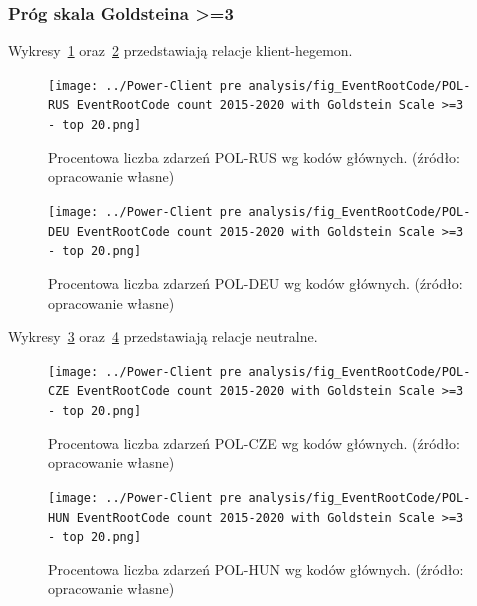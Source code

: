 \documentclass[11pt]{report}
\begin{document}
    \subsubsection{Próg skala Goldsteina >=3}\label{subsubsec:erc:próg-skala-goldsteina->=3}

    Wykresy~\ref{fig:Power-Client:ERC:Goldstein:POL-RUS} oraz~\ref{fig:Power-Client:ERC:Goldstein:POL-DEU} przedstawiają relacje klient-hegemon.

    \begin{figure}[tp]
        \centering
        \texttt{[image: ../Power-Client pre analysis/fig\_EventRootCode/POL-RUS EventRootCode count 2015-2020 with Goldstein Scale >=3 - top 20.png]}
        \caption{Procentowa liczba zdarzeń POL-RUS wg kodów głównych. (źródło: opracowanie własne)}
        \label{fig:Power-Client:ERC:Goldstein:POL-RUS}
    \end{figure}

    \begin{figure}[tp]
        \centering
        \texttt{[image: ../Power-Client pre analysis/fig\_EventRootCode/POL-DEU EventRootCode count 2015-2020 with Goldstein Scale >=3 - top 20.png]}
        \caption{Procentowa liczba zdarzeń POL-DEU wg kodów głównych. (źródło: opracowanie własne)}
        \label{fig:Power-Client:ERC:Goldstein:POL-DEU}
    \end{figure}

    Wykresy~\ref{fig:Power-Client:ERC:Goldstein:POL-CZE} oraz~\ref{fig:Power-Client:ERC:Goldstein:POL-HUN} przedstawiają relacje neutralne.


    \begin{figure}[tp]
        \centering
        \texttt{[image: ../Power-Client pre analysis/fig\_EventRootCode/POL-CZE EventRootCode count 2015-2020 with Goldstein Scale >=3 - top 20.png]}
        \caption{Procentowa liczba zdarzeń POL-CZE wg kodów głównych. (źródło: opracowanie własne)}
        \label{fig:Power-Client:ERC:Goldstein:POL-CZE}
    \end{figure}

    \begin{figure}[tp]
        \centering
        \texttt{[image: ../Power-Client pre analysis/fig\_EventRootCode/POL-HUN EventRootCode count 2015-2020 with Goldstein Scale >=3 - top 20.png]}
        \caption{Procentowa liczba zdarzeń POL-HUN wg kodów głównych. (źródło: opracowanie własne)}
        \label{fig:Power-Client:ERC:Goldstein:POL-HUN}
    \end{figure}
\end{document}
